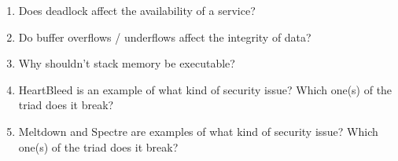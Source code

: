 \begin{enumerate}
\item Does deadlock affect the availability of a service?

\item Do buffer overflows / underflows affect the integrity of data?

\item Why shouldn't stack memory be executable?

\item HeartBleed is an example of what kind of security issue? Which one(s) of the triad does it break?

\item Meltdown and Spectre are examples of what kind of security issue? Which one(s) of the triad does it break?

\end{enumerate}



